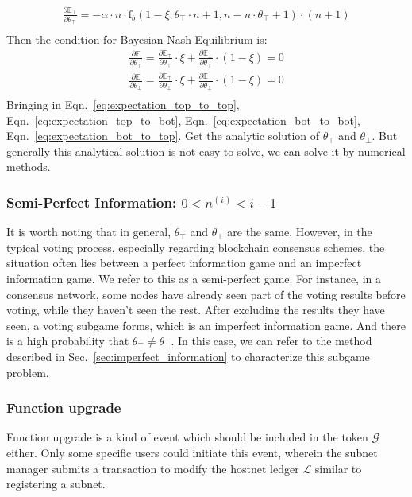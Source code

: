 \documentclass[11pt]{article}
\begin{document}
\begin{equation}
  \label{eq:expectation_bot_to_top}
  \begin{aligned}
  \frac{\partial{\mathbb{E}}_\bot}{\partial{\theta_\top}}= -\alpha\cdot n \cdot  \text{f}_b(1-\xi;\theta_\top\cdot n+1,n-n\cdot\theta_\top+1)\cdot(n+1)\\
  \end{aligned}
\end{equation}
Then the condition for Bayesian Nash Equilibrium is:
\begin{equation}
  \label{eq:partial_theta}
  \begin{aligned}
    \frac{\partial{\mathbb{E}}}{\partial{\theta_\top}}=\frac{\partial{\mathbb{E}_\top}}{\partial{\theta_\top}}\cdot\xi+\frac{\partial{\mathbb{E}_\bot}}{\partial{\theta_\top}}\cdot(1-\xi)= 0\\
    \frac{\partial{\mathbb{E}}}{\partial{\theta_\bot}}=\frac{\partial{\mathbb{E}_\top}}{\partial{\theta_\bot}}\cdot\xi+\frac{\partial{\mathbb{E}_\bot}}{\partial{\theta_\bot}}\cdot(1-\xi)= 0\\
  \end{aligned}
\end{equation}
Bringing in Eqn.~\ref{eq:expectation_top_to_top}, Eqn.~\ref{eq:expectation_top_to_bot}, Eqn.~\ref{eq:expectation_bot_to_bot}, Eqn.~\ref{eq:expectation_bot_to_top}. Get the analytic solution of $\theta_\top$ and $\theta_\bot$. But generally this analytical solution is not easy to solve, we can solve it by numerical methods.

\subsubsection{Semi-Perfect Information: $0<n^{(i)}<i-1$}
It is worth noting that in general, $\theta_\top$ and $\theta_\bot$ are the same. However, in the typical voting process, especially regarding blockchain consensus schemes, the situation often lies between a perfect information game and an imperfect information game. We refer to this as a semi-perfect game. For instance, in a consensus network, some nodes have already seen part of the voting results before voting, while they haven't seen the rest. After excluding the results they have seen, a voting subgame forms, which is an imperfect information game. And there is a high probability that $\theta_\top \neq \theta_\bot$. In this case, we can refer to the method described in Sec.~\ref{sec:imperfect_information} to characterize this subgame problem.
\subsubsection{Function upgrade}
Function upgrade is a kind of event which should be included in the token $\mathcal{G}$ either.
Only some specific users could initiate this event, wherein the subnet manager submits a transaction to modify the hostnet ledger $\mathcal{L}$ similar to registering a subnet.
\end{document}
